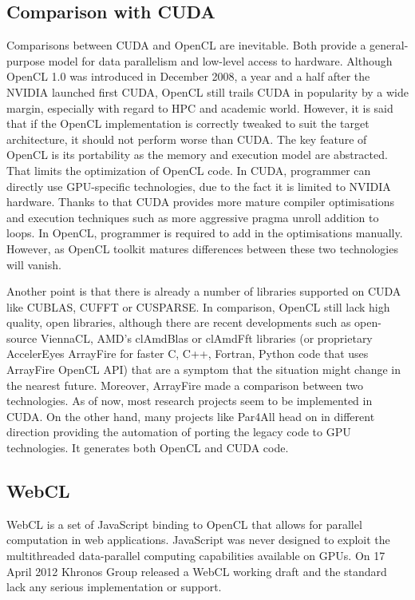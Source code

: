 \subsection{Comparison with CUDA}
Comparisons between CUDA and OpenCL are inevitable. Both provide a general-purpose model for data parallelism and low-level access to hardware. Although OpenCL 1.0 was introduced in December 2008, a year and a half after the NVIDIA launched first CUDA, OpenCL still trails CUDA in popularity by a wide margin, especially with regard to HPC and academic world.\cite{hpcwire2012reserachers} However, it is said that if the OpenCL implementation is correctly tweaked to suit the target architecture, it should not perform worse than CUDA. The key feature of OpenCL is its portability as the memory and execution model are abstracted. That limits the optimization of OpenCL code. In CUDA, programmer can directly use GPU-specific technologies, due to the fact it is limited to NVIDIA hardware. Thanks to that CUDA provides more mature compiler optimisations and execution techniques such as more aggressive pragma unroll addition to loops. In OpenCL, programmer is required to add in the optimisations manually. However, as OpenCL toolkit matures differences between these two technologies will vanish.\cite{hpcwire2012openclgains, openclnews2012}

Another point is that there is already a number of libraries supported on CUDA like CUBLAS, CUFFT or CUSPARSE. In comparison, OpenCL still lack high quality, open libraries, although there are recent developments such as open-source ViennaCL\cite{viennacl2012}, AMD's clAmdBlas or clAmdFft libraries (or proprietary AccelerEyes ArrayFire for faster C, C++, Fortran, Python code that uses ArrayFire OpenCL API) that are a symptom that the situation might change in the nearest future. Moreover, ArrayFire made a comparison between two technologies.\cite{accelereyes2012vs} As of now, most research projects seem to be implemented in CUDA. On the other hand, many projects like Par4All\cite{par4all2012} head on in different direction providing the automation of porting the legacy code to GPU technologies. It generates both OpenCL and CUDA code. 

\subsection{WebCL}
WebCL is a set of JavaScript binding to OpenCL that allows for parallel computation in web applications. JavaScript was never designed to exploit the multithreaded data-parallel computing capabilities available on GPUs. On 17 April 2012 Khronos Group released a WebCL working draft and the standard lack any serious implementation or support.\cite{khronos2012webcl}

